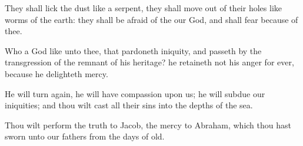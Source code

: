 {They shall
lick the
dust like a
serpent, they shall
move out of their
holes like
worms of the
earth: they shall be
afraid of the
{} our
God, and shall
fear because of thee.

Who
{} a
God like unto thee, that
pardoneth
iniquity, and passeth
by the
transgression of the
remnant of his
heritage? he
retaineth not his
anger for
ever, because he
delighteth
{}
mercy.

He will turn
again, he will have
compassion upon us; he will
subdue our
iniquities; and thou wilt
cast all their
sins into the
depths of the
sea.

Thou wilt
perform the
truth to
Jacob,
{} the
mercy to
Abraham, which thou hast
sworn unto our
fathers from the
days of
old.


\par }